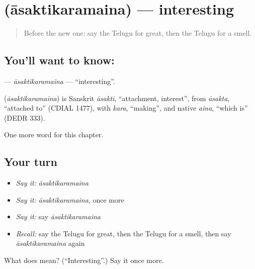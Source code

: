 \section[\texorpdfstring{\te{ఆసక్తికరమైన} (āsaktikaramaina)}{ఆసక్తికరమైన (āsaktikaramaina)}]{ (āsaktikaramaina) — interesting}

\label{lesson:TE-C181-asaktikaramaina}



\begin{quote}
Before the new one: say the Telugu for great, then the Telugu for a smell.
\end{quote}

\subsection*{You'll want to know: }
\textbf{} — \emph{āsaktikaramaina} — \textquotedblleft{}interesting\textquotedblright{}.

\begin{cousinweb}
\textbf{} (\emph{āsaktikaramaina}) is Sanskrit \emph{āsakti}, \textquotedblleft{}attachment, interest\textquotedblright{}, from \emph{āsakta}, \textquotedblleft{}attached to\textquotedblright{} (CDIAL 1477), with \emph{kara}, \textquotedblleft{}making\textquotedblright{}, and native \emph{aina}, \textquotedblleft{}which is\textquotedblright{} (DEDR 333).
\end{cousinweb}

\begin{grammarlens}[title={What you've built}]
One more word for this chapter.
\end{grammarlens}

\subsection*{Your turn}
\begin{itemize}
\raggedright
  \item \emph{Say it:} \emph{āsaktikaramaina}
  \item \emph{Say it:} \emph{āsaktikaramaina}, once more
  \item \emph{Say it:} say \emph{āsaktikaramaina}
  \item \emph{Recall:} say the Telugu for great, then the Telugu for a smell, then say \emph{āsaktikaramaina} again
\end{itemize}

\begin{tcolorbox}[breakable,colback=teal!4,colframe=teal!35!black,title={Before you move on}]
What does  mean? (\textquotedblleft{}Interesting\textquotedblright{}.) Say it once more.
\end{tcolorbox}
